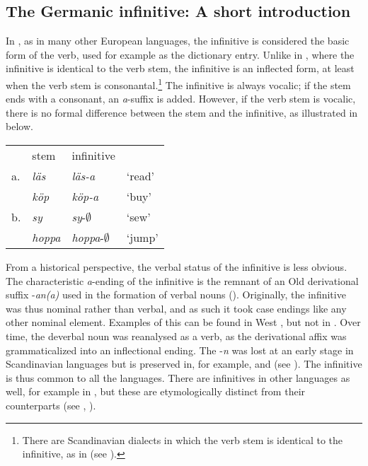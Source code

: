 \documentclass[output=paper]{langscibook}
\begin{document}
\subsection{The Germanic infinitive: A short introduction}\label{sec:kalm:3.1}



In , as in many other European languages, the infinitive is considered the basic form of the verb, used for example as the dictionary entry. Unlike in , where the infinitive is identical to the verb stem, the  infinitive is an inflected form, at least when the verb stem is consonantal.\footnote{There are Scandinavian dialects in which the verb stem is identical to the infinitive, as in  (see \citealt{Delsing2014Verbsystemet}).}  The  infinitive is always vocalic; if the stem ends with a consonant, an \textit{a}{}-suffix is added. However, if the verb stem is vocalic, there is no formal difference between the stem and the infinitive, as illustrated in  below. 


\ea\label{ex:kalm:2}
\begin{tabular}[t]{llll}
{} & stem & infinitive & {}\\
a. & \textit{läs} & \textit{läs-a} & ‘read’\\
{} & \textit{köp} & \textit{köp-a} & ‘buy’\\	
b. & \textit{sy} & \textit{sy}{}-${\emptyset}$ & ‘sew’\\
{} & \textit{hoppa} & \textit{hoppa}{}-${\emptyset}$ & ‘jump’\\
\end{tabular}
\z

From a historical perspective, the verbal status of the infinitive is less obvious. The characteristic \textit{a}{}-ending of the  infinitive is the remnant of an Old  derivational suffix -\textit{an(a)} used in the formation of verbal nouns (\citealt[193]{FalkTorp1900}). Originally, the infinitive was thus nominal rather than verbal, and as such it took case endings like any other nominal element. Examples of this can be found in West , but not in  \citep[205]{Prokosch1939}. Over time, the deverbal noun was reanalysed as a verb, as the derivational affix was grammaticalized into an inflectional ending. The -\textit{n} was lost at an early stage in Scandinavian languages but is preserved in, for example,  and  (see \citealt[636]{Noreen1898}). The infinitive is thus common to all the  languages. There are infinitives in other  languages as well, for example in , but these are etymologically distinct from their  counterparts (see \citealt[205]{Prokosch1939}, \citealt[193]{FalkTorp1900}).
\end{document}
